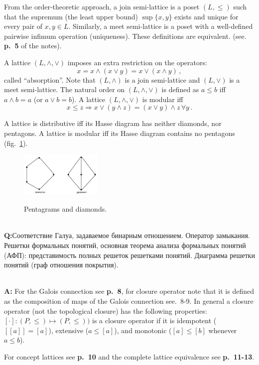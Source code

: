 \documentclass[a4paper]{article}
\newcommand{\rus}[1]{\foreignlanguage{russian}{#1}}
\begin{document}
From the order-theoretic approach, a join semi-lattice is a poset $(L, \leq)$ such
that the supremum (the least upper bound) $\sup\{x, y\}$ exists and unique for every
pair of $x, y \in L$. Similarly, a meet semi-lattice is a poset with a well-defined
pairwise infimum operation (uniqueness). These definitions are equivalent. (see.
\textbf{p.~5} of the notes).

A lattice $(L, \wedge, \vee)$ imposes an extra restriction on the operators:
$$ x = x \wedge (x\vee y) = x \vee ( x\wedge y) \,, $$
called ``absorption''. Note that $(L, \wedge)$ is a join semi-lattice and $(L, \vee)$
is a meet semi-lattice. The natural order on $(L, \wedge, \vee)$ is defined as
$a\leq b$ iff $a\wedge b=a$ (or $a\vee b = b$). A lattice $(L, \wedge, \vee)$ is
modular iff
$$ x\leq z \Rightarrow x \vee (y\wedge z) = (x \vee y ) \wedge z\, \forall y\,. $$

A lattice is distributive iff its Hasse diagram has neither diamonds, nor pentagons.
A lattice is modular iff its Hasse diagram contains no pentagons (fig.~\ref{fig:lattice_pen_di}).
\begin{figure}
    \centering
    \includegraphics[width=0.35\textwidth]{pents_and_diamonds.png}
    \label{fig:lattice_pen_di}
    \caption{Pentagrams and diamonds.}
\end{figure}

\hfill\\\noindent\textbf{Q:}\rus{Соответствие Галуа, задаваемое бинарным отношением. Оператор
замыкания. Решетки формальных понятий, основная теорема анализа формальных понятий
(АФП): представимость полных решеток решетками понятий. Диаграмма решетки понятий
(граф отношения покрытия).}

\hfill\\\noindent\textbf{A:}
For the Galois connection see \textbf{p.~8}, for closure operator note that it is
defined as the composition of maps of the Galois connection see.~8-9. In general
a closure  operator (not the topological closure) has the following properties:
$[\cdot]: (P, \leq) \mapsto (P, \leq))$ is a closure operator if it is idempotent
($[[a]]=[a]$), extensive ($a\leq [a]$), and monotonic ($[a]\leq [b]$ whenever
$a\leq b$).

\noindent For concept lattices see \textbf{p.~10} and the complete lattice equivalence
see \textbf{p.~11-13}.
\end{document}
